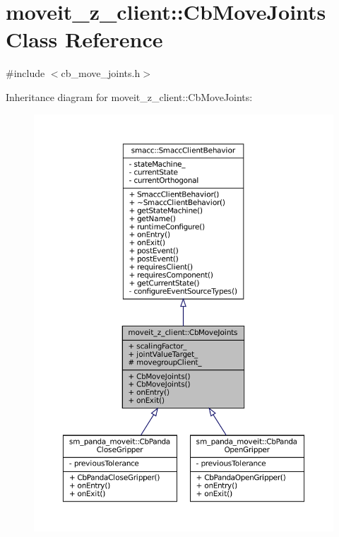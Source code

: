 \hypertarget{classmoveit__z__client_1_1CbMoveJoints}{}\section{moveit\+\_\+z\+\_\+client\+:\+:Cb\+Move\+Joints Class Reference}
\label{classmoveit__z__client_1_1CbMoveJoints}


{\ttfamily \#include $<$cb\+\_\+move\+\_\+joints.\+h$>$}



Inheritance diagram for moveit\+\_\+z\+\_\+client\+:\+:Cb\+Move\+Joints\+:
\nopagebreak
\begin{figure}[H]
\begin{center}
\leavevmode
\includegraphics[width=350pt]{classmoveit__z__client_1_1CbMoveJoints__inherit__graph}
\end{center}
\end{figure}


